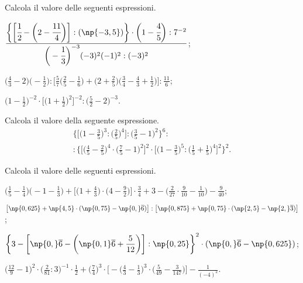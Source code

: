 \begin{esercizio}[\Ast]
 Calcola il valore delle seguenti espressioni.
\begin{enumeratea}
\spazielenx
\item $\displaystyle{\frac{\bigg\{\bigg[\cfrac{1}{2}-\bigg(2-\cfrac{11}{4}\bigg)\bigg]:(\np{-3,5})\bigg\}\cdot
\bigg(1-\cfrac{4}{5}\bigg):7^{-2}}{\bigg(-{\cfrac{1}{3}}\bigg)^{-3}(-3)^{2}(-1)^{2}:(-3)^{2}}}$;
\item $\displaystyle{\bigg(\frac{4}{3}-2\bigg)\bigg(-{\frac{1}{2}}\bigg):\bigg[\frac{5}{7}\bigg(\frac{2}{5}-\frac{1}{6}\bigg)
+\bigg(2+\frac{2}{5}\bigg)\bigg(\frac{3}{4}-\frac{4}{3}+\frac{1}{2}\bigg)\bigg]:\frac{11}{6}}$;
\item $\displaystyle{\bigg(1-\frac{1}{2}\bigg)^{-2}\cdot
\bigg[\bigg(1+\frac{1}{2}\bigg)^{2}\bigg]^{-2}:\bigg(\frac{5}{2}-2\bigg)^{-3}}$.

\end{enumeratea}
\end{esercizio}

\begin{esercizio}[\Ast]
Calcola il valore della seguente espressione.
\begin{multline*}
 \bigg\{\bigg[\bigg(1-\frac{3}{5}\bigg)^3:\bigg(\frac{2}{5}\bigg)^{4}\bigg]:\bigg(\frac{3}{5}-1\bigg)^{2}%
\bigg\}^{6}:\\
:\bigg\{\bigg[\bigg(\frac{4}{5}-\frac{2}{5}\bigg)^{4}\cdot\bigg(\frac{7}{5}-1\bigg)^2\bigg]^{2}\cdot%
\bigg[\bigg(1-\frac{3}{5}\bigg)^{5}:\bigg(\frac{1}{5}+\frac{1}{5}\bigg)^{4}\bigg]^{2}\bigg\}^{2}.
\end{multline*}
\end{esercizio}


\begin{esercizio}[\Ast]
 Calcola il valore delle seguenti espressioni.
\begin{enumeratea}
\spazielenx
\item $\displaystyle{\bigg(\frac{1}{5}-\frac{1}{4}\bigg)\bigg(-1-\frac{1}{3}\bigg)+\bigg[\bigg(1+\frac{4}{3}\bigg)\cdot
\bigg(4-\frac{9}{2}\bigg)\bigg]\cdot{\frac{3}{4}}+3-\bigg(\frac{2}{27}\cdot{\frac{9}{10}}-\frac{1}{10}\bigg)-\frac{9}{40}}$;
\item $\displaystyle{\left[\np{0,625}+\np{4,5}\cdot(\np{0,75}-\np{0,}\overline{6})\right]:\left[\np{0,875}+\np{0,75}\cdot(\np{2,5}-\np{2,}\overline{3})\right]}$;
\item $\displaystyle{\bigg\{3-\bigg[\np{0,}\overline{6}-\bigg(\np{0,1}\overline{6}+\frac{5}{12}\bigg)\bigg]:\np{0,25}\bigg\}^{2}\cdot
(\np{0,}\overline{6}-\np{0,625})}$;
\item $\displaystyle{\bigg(\frac{12}{9}-1\bigg)^{2}\cdot\bigg(\frac{2}{81}:3\bigg)^{-1}\cdot\frac{1}{2}+\bigg(\frac{7}{4}\bigg)^{3}\cdot
\bigg[-\bigg(\frac{4}{3}-\frac{1}{3}\bigg)^{3}\cdot\bigg(\frac{5}{49}-\frac{3}{147}\bigg)\bigg]-\frac{1}{(-4)^{2}}}$.
\end{enumeratea}
\end{esercizio}


